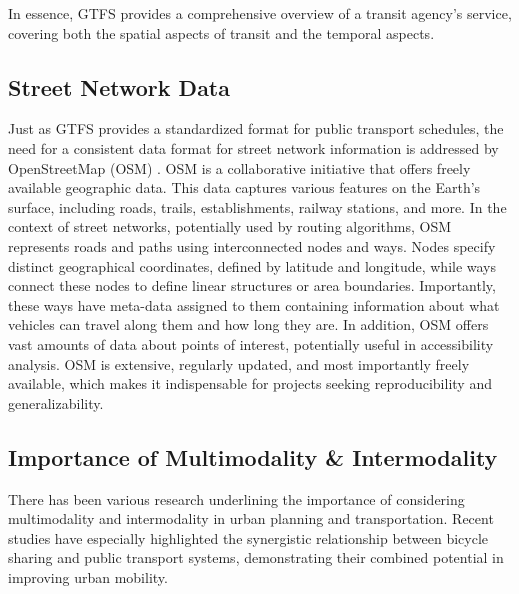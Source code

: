 
In essence, GTFS provides a comprehensive overview of a transit agency's service, covering both the spatial aspects of transit and the temporal aspects.

\subsection{Street Network Data}
\label{subsec:street_network_data}

Just as GTFS provides a standardized format for public transport schedules, the need for a consistent data format for street network information is addressed by OpenStreetMap (OSM) .
OSM is a collaborative initiative that offers freely available geographic data.
This data captures various features on the Earth's surface, including roads, trails, establishments, railway stations, and more.
In the context of street networks, potentially used by routing algorithms, OSM represents roads and paths using interconnected nodes and ways.
Nodes specify distinct geographical coordinates, defined by latitude and longitude, while ways connect these nodes to define linear structures or area boundaries.
Importantly, these ways have meta-data assigned to them containing information about what vehicles can travel along them and how long they are.
In addition, OSM offers vast amounts of data about points of interest, potentially useful in accessibility analysis.
OSM is extensive, regularly updated, and most importantly freely available, which makes it indispensable for projects seeking reproducibility and generalizability.


\subsection{Importance of Multimodality \& Intermodality}
\label{subsec:importance_of_multimodality_and_intermodality}
There has been various research underlining the importance of considering multimodality and intermodality in urban planning and transportation.
Recent studies have especially highlighted the synergistic relationship between bicycle sharing and public transport systems, demonstrating their combined potential in improving urban mobility.

